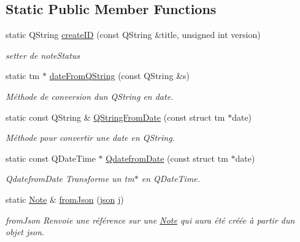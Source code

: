 \subsection*{Static Public Member Functions}
\begin{DoxyCompactItemize}
\item 
\mbox{\label{classNote_a34e2e9bbaa92afe9cf2dfee241627df6}} 
static Q\+String \hyperlink{classNote_a34e2e9bbaa92afe9cf2dfee241627df6}{create\+ID} (const Q\+String \&title, unsigned int version)
\begin{DoxyCompactList}\small\item\em setter de note\+Status \end{DoxyCompactList}\item 
static tm $\ast$ \hyperlink{classNote_aad3d92ba06eb33c3f1710b1e4cac3d5e}{date\+From\+Q\+String} (const Q\+String \&s)
\begin{DoxyCompactList}\small\item\em Méthode de conversion d\textquotesingle{}un Q\+String en date. \end{DoxyCompactList}\item 
static const Q\+String \& \hyperlink{classNote_acee08a412ed39b96daac7f8391b375bf}{Q\+String\+From\+Date} (const struct tm $\ast$date)
\begin{DoxyCompactList}\small\item\em Méthode pour convertir une date en Q\+String. \end{DoxyCompactList}\item 
static const Q\+Date\+Time $\ast$ \hyperlink{classNote_ae970e7fb5ef01469aa488d8cdc8bdd57}{Qdatefrom\+Date} (const struct tm $\ast$date)
\begin{DoxyCompactList}\small\item\em Qdatefrom\+Date Transforme un tm$\ast$ en Q\+Date\+Time. \end{DoxyCompactList}\item 
static \hyperlink{classNote}{Note} \& \hyperlink{classNote_aaa48dd8dd594ee6daddd25c17c67ba65}{from\+Json} (\hyperlink{classnlohmann_1_1basic__json}{json} j)
\begin{DoxyCompactList}\small\item\em from\+Json Renvoie une référence sur une \hyperlink{classNote}{Note} qui aura été créée à partir d\textquotesingle{}un objet json. \end{DoxyCompactList}\end{DoxyCompactItemize}


